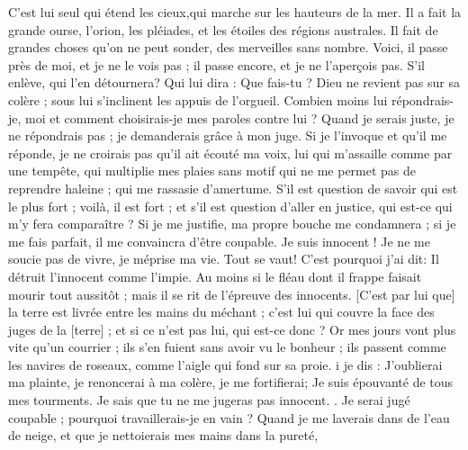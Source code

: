 \begin{multicols}{2}
 C'est lui seul qui étend les cieux,qui marche sur les hauteurs de la mer.
Il a fait la grande ourse, l'orion, les pléiades, et les étoiles des régions australes.
Il fait de grandes choses qu'on ne peut sonder, des merveilles sans nombre.
Voici, il passe près de moi, et je ne le vois pas ; il passe encore, et je ne l'aperçois pas.
S'il enlève, qui l'en détournera? Qui lui dira : Que fais-tu ?
Dieu ne revient pas sur sa colère ; sous lui s'inclinent les appuis de l'orgueil.
Combien moins lui répondrais-je, moi et comment choisirais-je mes paroles contre lui ? 
Quand je serais juste, je ne répondrais pas ; je demanderais grâce à mon juge.
Si je l'invoque et qu'il me réponde, je ne croirais pas qu'il ait écouté ma voix,
lui qui m'assaille comme par une tempête, qui multiplie mes plaies sans motif 
qui ne me permet pas de reprendre haleine ; qui me rassasie d'amertume.
S'il est question de savoir qui est le plus fort ; voilà, il est fort ; et s'il est question d'aller en justice, qui est-ce qui m'y fera comparaître ? 
Si je me justifie, ma propre bouche me condamnera ; si je me fais parfait, il me convaincra d'être coupable.
Je suis innocent ! Je ne me soucie pas de vivre, je méprise ma vie.
Tout se vaut! C'est pourquoi j'ai dit: Il détruit l'innocent comme l'impie. 
Au moins si le fléau dont il frappe faisait mourir tout aussitôt ; mais il se rit de l'épreuve des innocents. 
[C'est par lui que] la terre est livrée entre les mains du méchant ; c'est lui qui couvre la face des juges de la [terre] ; et si ce n'est pas lui, qui est-ce donc ? 
Or mes jours vont plus vite qu'un courrier ; ils s'en fuient sans avoir vu le bonheur ;
ils passent comme les navires de roseaux, comme l'aigle qui fond sur sa proie.
i je dis : J'oublierai ma plainte, je renoncerai à ma colère, je me fortifierai; 
Je suis épouvanté de tous mes tourments. Je sais que tu ne me jugeras pas innocent. .
Je serai jugé coupable ; pourquoi travaillerais-je en vain ?
Quand je me laverais dans de l'eau de neige, et que je nettoierais mes mains dans la pureté, 

\end{multicols}
